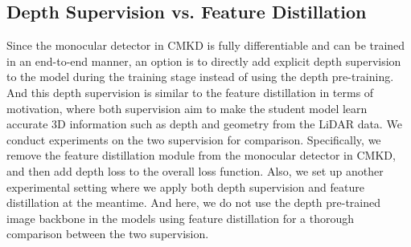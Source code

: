 \documentclass[runningheads]{llncs}
\begin{document}
\subsection{Depth Supervision vs. Feature Distillation}
Since the monocular detector in CMKD is fully differentiable and can be trained in an end-to-end manner, an option is to directly add explicit depth supervision to the model during the training stage instead of using the depth pre-training.
And this depth supervision is similar to the feature distillation in terms of motivation, where both supervision aim to make the student model learn accurate 3D information such as depth and geometry from the LiDAR data.
We conduct experiments on the two supervision for comparison.
Specifically, we remove the feature distillation module from the monocular detector in CMKD, and then add depth loss  to the overall loss function. 
Also, we set up another experimental setting where we apply both depth supervision and feature distillation at the meantime.
And here, we do not use the depth pre-trained image backbone in the models using feature distillation for a thorough comparison between the two supervision.

\begin{table}[t]
    \small
    \centering
        \caption{Comparison between depth supervision and feature distillation.
         denotes using depth supervision. 
         denotes using feature distillation.
        The results differ when using training sets with different amounts of training samples.}
    \label{tab:abl depth vs feat}
\end{table}
\end{document}
